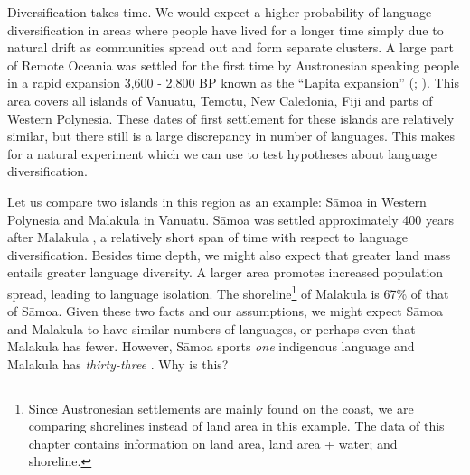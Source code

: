 \documentclass[a4paper,10pt]{article} %
\begin{document}




Diversification takes time. We would expect a higher probability of language diversification in areas where people have lived for a longer time simply due to natural drift as communities spread out and form separate clusters. A large part of Remote Oceania was settled for the first time by Austronesian speaking people in a rapid expansion 3,600 - 2,800 BP known as the ``Lapita expansion'' (\citet[106-7]{bellwood2006austronesians}; \citet[137]{rieth_cochrane_2018}). This area covers all islands of Vanuatu, Temotu, New Caledonia, Fiji and parts of Western Polynesia. These dates of first settlement for these islands are relatively similar, but there still is a large discrepancy in number of languages. This makes for a natural experiment which we can use to test hypotheses about language diversification.

Let us compare two islands in this region as an example: S\={a}moa in Western Polynesia and Malakula in Vanuatu. S\={a}moa was settled approximately 400 years after Malakula  \citep[137-8]{rieth_cochrane_2018}, a relatively short span of time with respect to language diversification. Besides time depth, we might also expect that greater land mass entails greater language diversity. A larger area promotes increased population spread, leading to language isolation. The shoreline\footnote{Since Austronesian settlements are mainly found on the coast, we are comparing shorelines instead of land area in this example. The data of this chapter contains information on land area, land area + water; and shoreline.} of Malakula is 67\% of that of S\={a}moa. Given these two facts and our assumptions, we might expect S\={a}moa and Malakula to have similar numbers of languages, or perhaps even that Malakula has fewer. However, S\={a}moa sports \emph{one} indigenous language and Malakula has \emph{thirty-three} \citep{glottolog40}. Why is this?

\end{document}
